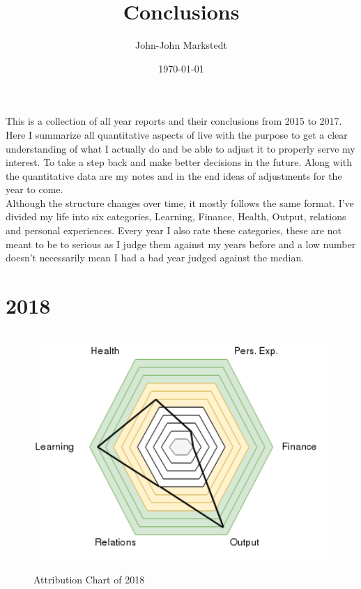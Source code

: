 \documentclass[a4paper]{article}
\title{Conclusions}
\author{John-John Markstedt}
\date{\today}
\begin{document}
\maketitle

This is a collection of all year reports and their conclusions from 2015 to 2017. Here I summarize all quantitative aspects of live with the purpose to get a clear understanding of what I actually do and be able to adjust it to properly serve my interest. To take a step back and make better decisions in the future. Along with the quantitative data are my notes and in the end ideas of adjustments for the year to come. \\
   Although the structure changes over time, it mostly follows the same format. I've divided my life into six categories, Learning, Finance, Health, Output, relations and personal experiences. Every year I also rate these categories, these are not meant to be to serious as I judge them against my years before and a low number doesn't necessarily mean I had a bad year judged against the median. 


\clearpage

\section{2018}

\begin{figure}[h!]
  \includegraphics[height=255pt]{Attributes_Chart_2018.png}
  \caption{Attribution Chart of 2018}
  \label{fig:2018}
\end{figure} 
\end{document}

